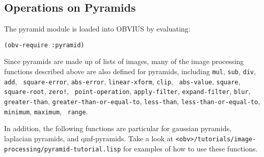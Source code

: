 \subsection{Operations on Pyramids}

The pyramid module is loaded into OBVIUS by evaluating:
\begin{verbatim}
(obv-require :pyramid)
\end{verbatim}
Since pyramids are made up of lists of images, many of the image
processing functions described above are also defined for pyramids,
including {\tt mul}, {\tt sub}, {\tt div}, {\tt add}, {\tt
square-error}, {\tt abs-error}, {\tt linear-xform}, {\tt clip}, {\tt
abs-value}, {\tt square}, {\tt square-root}, {\tt zero!}, {\tt
point-operation}, {\tt apply-filter}, {\tt expand-filter}, {\tt blur},
{\tt greater-than}, {\tt greater-than-or-equal-to}, {\tt less-than},
{\tt less-than-or-equal-to}, {\tt minimum}, {\tt maximum}, {\tt
range}.

In addition, the following functions are particular for gaussian
pyramids, laplacian pyramids, and qmf-pyramids.  Take a look at
{\tt <obv>/tutorials/image-processing/pyramid-tutorial.lisp} for
examples of how to use these functions.

